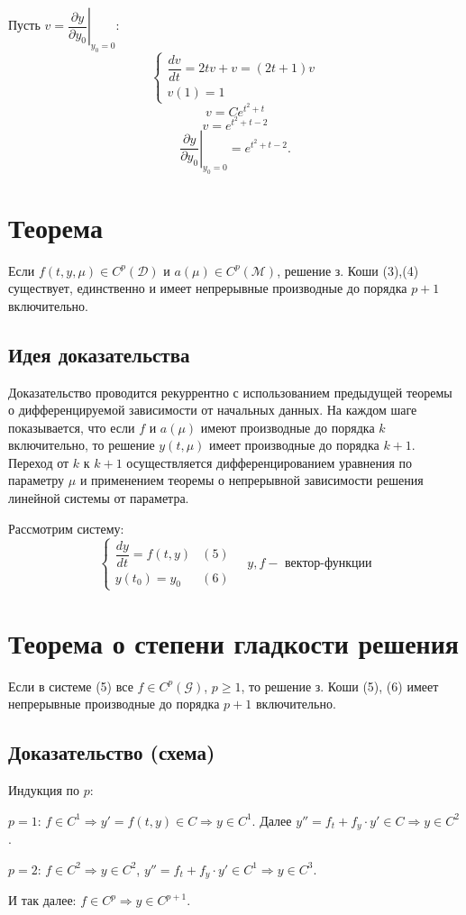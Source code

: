\documentclass[a4paper,12pt]{article}
\begin{document}
Пусть $v = \left. \dfrac{\partial y}{\partial y_0} \right|_{y_0 = 0}$:
\[
    \begin{cases}
        \dfrac{dv}{dt} = 2tv + v = (2t + 1)v \\[8pt]
        v(1) = 1
    \end{cases}
\]
\[
    v = C e^{t^2 + t}
\]
\[
    v = e^{t^2 + t - 2}
\]
\[
    \left. \frac{\partial y}{\partial y_0} \right|_{y_0 = 0} = e^{t^2 + t - 2}.
\]

\section{Теорема}
Если $f (t, y, \mu)\in C^p(\mathcal{D})$ и $a(\mu) \in C^p(\mathcal{M})$, решение з. Коши (3),(4) существует, единственно и имеет непрерывные производные до порядка $p+1$ включительно.

\subsection*{Идея доказательства}
Доказательство проводится рекуррентно с использованием предыдущей теоремы о дифференцируемой зависимости от начальных данных. На каждом шаге показывается, что если $f$ и $a(\mu)$ имеют производные до порядка $k$ включительно, то решение $y(t,\mu)$ имеет производные до порядка $k+1$. Переход от $k$ к $k+1$ осуществляется дифференцированием уравнения по параметру $\mu$ и применением теоремы о непрерывной зависимости решения линейной системы от параметра.

\vspace{1em}
\noindent Рассмотрим систему:
\[
    \begin{cases} 
        \dfrac{dy}{dt} = f(t, y) & (5) \\ 
        y(t_0) = y_0 & (6) 
    \end{cases} \quad y, f - \text{ вектор-функции}
\]

\section{Теорема о степени гладкости решения}
Если в системе (5) все $f \in C^p(\mathcal{G})$, $p \ge 1$, то решение з. Коши (5), (6) имеет непрерывные производные до порядка $p+1$ включительно.
\subsection*{Доказательство (схема)}

Индукция по $p$:

\medskip
$p = 1$: $f \in C^1 \Rightarrow y' = f(t,y) \in C \Rightarrow y \in C^1$. 
Далее $y'' = f_t + f_y \cdot y' \in C \Rightarrow y \in C^2$.

\medskip
$p = 2$: $f \in C^2 \Rightarrow y \in C^2$, 
$y'' = f_t + f_y \cdot y' \in C^1 \Rightarrow y \in C^3$.

\medskip
И так далее: $f \in C^p \Rightarrow y \in C^{p+1}$.
\end{document}
